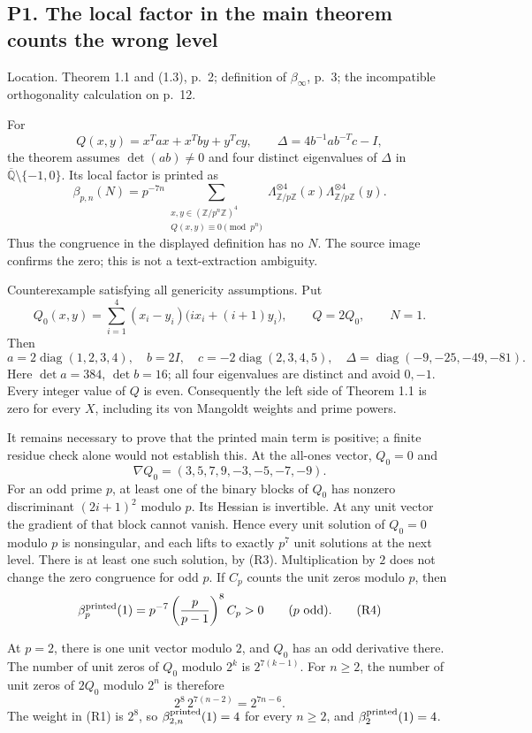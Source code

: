 \documentclass[10pt]{article}
\begin{document}
\subsection*{P1. The local factor in the main theorem counts the wrong level}
Location. Theorem 1.1 and (1.3), p. 2; definition of \(\beta_\infty\), p. 3; the incompatible orthogonality calculation on p. 12.\par
For \[Q(x,y)=x^Tax+x^Tby+y^Tcy,\qquad
 \Delta=4b^{-1}ab^{-T}c-I,\] the theorem assumes \(\det(ab)\ne0\) and four distinct eigenvalues of \(\Delta\) in \(\overline{\mathbb Q}\setminus\{-1,0\}\). Its local factor is printed as \[\beta_{p,n}(N)=p^{-7n}
 \sum_{\substack{x,y\in(\mathbb Z/p^n\mathbb Z)^4\\Q(x,y)\equiv0\pmod {p^n}}}
 \Lambda_{\mathbb Z/p\mathbb Z}^{\otimes4}(x)\Lambda_{\mathbb Z/p\mathbb Z}^{\otimes4}(y).
 \tag{R1}\] Thus the congruence in the displayed definition has no \(N\). The source image confirms the zero; this is not a text-extraction ambiguity.\par
Counterexample satisfying all genericity assumptions. Put \[Q_0(x,y)=\sum_{i=1}^4(x_i-y_i)\bigl(i x_i+(i+1)y_i\bigr),
 \qquad Q=2Q_0,\qquad N=1.
 \tag{R2}\] Then \[a=2\operatorname{diag}(1,2,3,4),\quad b=2I,\quad
 c=-2\operatorname{diag}(2,3,4,5),\quad
 \Delta=\operatorname{diag}(-9,-25,-49,-81).\] Here \(\det a=384\), \(\det b=16\); all four eigenvalues are distinct and avoid \(0,-1\). Every integer value of \(Q\) is even. Consequently the left side of Theorem 1.1 is zero for every \(X\), including its von Mangoldt weights and prime powers.\par
It remains necessary to prove that the printed main term is positive; a finite residue check alone would not establish this. At the all-ones vector, \(Q_0=0\) and \[\nabla Q_0=(3,5,7,9,-3,-5,-7,-9).
 \tag{R3}\] For an odd prime \(p\), at least one of the binary blocks of \(Q_0\) has nonzero discriminant \((2i+1)^2\) modulo \(p\). Its Hessian is invertible. At any unit vector the gradient of that block cannot vanish. Hence every unit solution of \(Q_0=0\) modulo \(p\) is nonsingular, and each lifts to exactly \(p^7\) unit solutions at the next level. There is at least one such solution, by (R3). Multiplication by \(2\) does not change the zero congruence for odd \(p\). If \(C_p\) counts the unit zeros modulo \(p\), then \[\beta_p^{\rm printed}(1)
 =p^{-7}\left(\frac p{p-1}\right)^8 C_p>0
 \qquad(p\ \hbox{odd}).
 \tag{R4}\]\par
At \(p=2\), there is one unit vector modulo \(2\), and \(Q_0\) has an odd derivative there. The number of unit zeros of \(Q_0\) modulo \(2^k\) is \(2^{7(k-1)}\). For \(n\ge2\), the number of unit zeros of \(2Q_0\) modulo \(2^n\) is therefore \[2^8\,2^{7(n-2)}=2^{7n-6}.\] The weight in (R1) is \(2^8\), so \(\beta_{2,n}^{\rm printed}(1)=4\) for every \(n\ge2\), and \(\beta_2^{\rm printed}(1)=4\).\par
\end{document}
